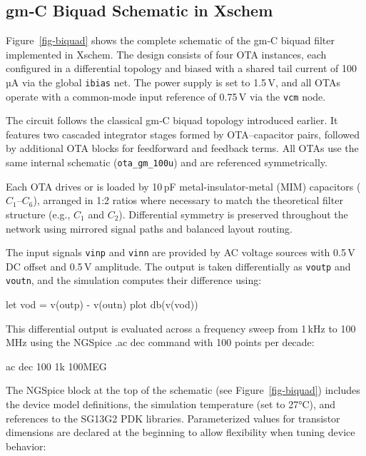 \documentclass[
  letterpaper,
]{scrbook}
\newenvironment{Shaded}{}{}
\newcommand{\NormalTok}[1]{\textcolor[rgb]{0.14,0.16,0.18}{#1}}
\begin{document}
\subsection{gm‑C Biquad Schematic in
Xschem}\label{gmc-biquad-schematic-in-xschem}

Figure~\ref{fig-biquad} shows the complete schematic of the gm‑C biquad
filter implemented in Xschem. The design consists of four OTA instances,
each configured in a differential topology and biased with a shared tail
current of 100\,µA via the global \texttt{ibias} net. The power supply
is set to 1.5\,V, and all OTAs operate with a common-mode input
reference of 0.75\,V via the \texttt{vcm} node.

The circuit follows the classical gm‑C biquad topology introduced
earlier. It features two cascaded integrator stages formed by
OTA--capacitor pairs, followed by additional OTA blocks for feedforward
and feedback terms. All OTAs use the same internal schematic
(\texttt{ota\_gm\_100u}) and are referenced symmetrically.

Each OTA drives or is loaded by 10\,pF metal-insulator-metal (MIM)
capacitors (\(C_1\)--\(C_6\)), arranged in 1:2 ratios where necessary to
match the theoretical filter structure (e.g., \(C_1\) and \(C_2\)).
Differential symmetry is preserved throughout the network using mirrored
signal paths and balanced layout routing.

The input signals \texttt{vinp} and \texttt{vinn} are provided by AC
voltage sources with 0.5\,V DC offset and 0.5\,V amplitude. The output
is taken differentially as \texttt{voutp} and \texttt{voutn}, and the
simulation computes their difference using:

\begin{Shaded}
\begin{Highlighting}[]
\NormalTok{let vod = v(outp) {-} v(outn)}
\NormalTok{plot db(v(vod))}
\end{Highlighting}
\end{Shaded}

This differential output is evaluated across a frequency sweep from
1\,kHz to 100\,MHz using the NGSpice .ac dec command with 100 points per
decade:

\begin{Shaded}
\begin{Highlighting}[]
\NormalTok{ac dec 100 1k 100MEG}
\end{Highlighting}
\end{Shaded}

The NGSpice block at the top of the schematic (see
Figure~\ref{fig-biquad}) includes the device model definitions, the
simulation temperature (set to 27°C), and references to the SG13G2 PDK
libraries. Parameterized values for transistor dimensions are declared
at the beginning to allow flexibility when tuning device behavior:
\end{document}
